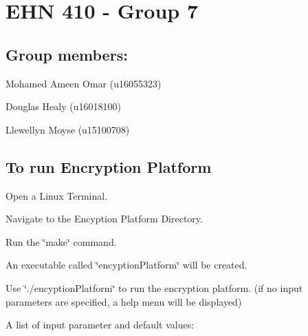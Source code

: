 

 \section*{E\+HN 410 -\/ Group 7}







 \subsection*{Group members\+:}




\begin{DoxyItemize}
\item Mohamed Ameen Omar (u16055323)
\item Douglas Healy (u16018100)
\item Llewellyn Moyse (u15100708)
\end{DoxyItemize}



 \subsection*{To run Encryption Platform}




\begin{DoxyEnumerate}
\item Open a Linux Terminal.
\item Navigate to the Encyption Platform Directory.
\item Run the \char`\"{}make\char`\"{} command.
\item An executable called \char`\"{}encyption\+Platform\char`\"{} will be created.
\item Use \char`\"{}./encyption\+Platform\char`\"{} to run the encryption platform. (if no input parameters are specified, a help menu will be displayed)
\item A list of input parameter and default values\+:
\end{DoxyEnumerate}

